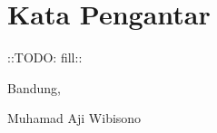 \chapter*{Kata Pengantar}

::TODO: fill::

\begin{flushright}
  \vspace{0.5cm}
  Bandung, \tanggalpengesahan
  
  
  \vspace{1.5cm}
  
  Muhamad Aji Wibisono
\end{flushright}